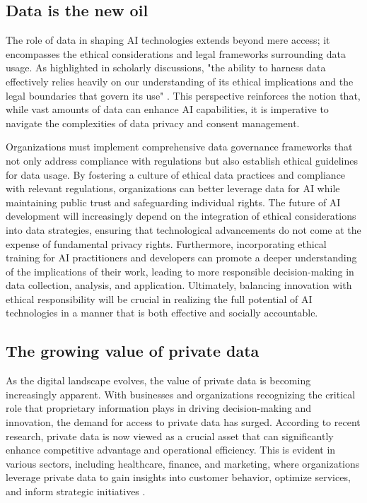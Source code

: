 \subsection{Data is the new oil}
The role of data in shaping AI technologies extends beyond mere access; it encompasses the ethical considerations and legal frameworks surrounding data usage. As highlighted in scholarly discussions, "the ability to harness data effectively relies heavily on our understanding of its ethical implications and the legal boundaries that govern its use" \cite{heinonline2024}. This perspective reinforces the notion that, while vast amounts of data can enhance AI capabilities, it is imperative to navigate the complexities of data privacy and consent management. 

Organizations must implement comprehensive data governance frameworks that not only address compliance with regulations but also establish ethical guidelines for data usage. By fostering a culture of ethical data practices and compliance with relevant regulations, organizations can better leverage data for AI while maintaining public trust and safeguarding individual rights. The future of AI development will increasingly depend on the integration of ethical considerations into data strategies, ensuring that technological advancements do not come at the expense of fundamental privacy rights. Furthermore, incorporating ethical training for AI practitioners and developers can promote a deeper understanding of the implications of their work, leading to more responsible decision-making in data collection, analysis, and application. Ultimately, balancing innovation with ethical responsibility will be crucial in realizing the full potential of AI technologies in a manner that is both effective and socially accountable.

\subsection{The growing value of private data}
As the digital landscape evolves, the value of private data is becoming increasingly apparent. With businesses and organizations recognizing the critical role that proprietary information plays in driving decision-making and innovation, the demand for access to private data has surged. According to recent research, private data is now viewed as a crucial asset that can significantly enhance competitive advantage and operational efficiency. This is evident in various sectors, including healthcare, finance, and marketing, where organizations leverage private data to gain insights into customer behavior, optimize services, and inform strategic initiatives \cite{citeseerx2024}.

